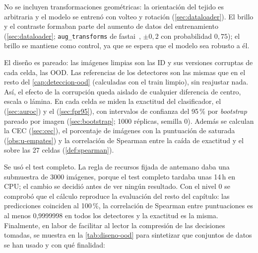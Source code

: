 No se incluyen transformaciones geométricas: la orientación del tejido es arbitraria y el modelo se entrenó con volteo y rotación (\cref{sec:dataloader}). El brillo y el contraste formaban parte del aumento de datos del entrenamiento (\cref{sec:dataloader}; \texttt{aug\_transforms} de fastai~\cite{howard2020fastai}, $\pm 0{,}2$ con probabilidad $0{,}75$); el brillo se mantiene como control, ya que se espera que el modelo sea robusto a él.

El diseño es pareado: las imágenes limpias son las ID y sus versiones corruptas de cada celda, las OOD. Las referencias de los detectores son las mismas que en el resto del \cref{cap:deteccion-ood} (calculadas con el train limpio), sin reajustar nada. Así, el efecto de la corrupción queda aislado de cualquier diferencia de centro, escala o lámina. En cada celda se miden la exactitud del clasificador, el \AUROC (\cref{sec:auroc}) y el  (\cref{sec:fpr95}), con intervalos de confianza del 95\,\% por \emph{bootstrap} pareado por imagen (\cref{sec:bootstrap}; \num{1000} réplicas, semilla 0). Además se calculan la CEC (\cref{sec:cec}), el porcentaje de imágenes con la puntuación de \stoodx saturada (\cref{obs:u-empates}) y la correlación de Spearman entre la caída de exactitud y el \AUROC sobre las 27 celdas (\cref{def:spearman}).

Se usó el test completo. La regla de recursos fijada de antemano daba una submuestra de \num{3000} imágenes, porque el test completo tardaba unas 14\,h en CPU; el cambio se decidió antes de ver ningún resultado. Con el nivel 0 se comprobó que el cálculo reproduce la evaluación del resto del capítulo: las predicciones coinciden al 100\,\%, la correlación de Spearman entre puntuaciones es al menos 0,9999998 en todos los detectores y la exactitud es la misma.
Finalmente, en labor de facilitar al lector la compresión de las decisiones tomadas, se muestra en la \cref{tab:diseno-ood} para sintetizar que conjuntos de datos se han usado y 
con qué finalidad: 

